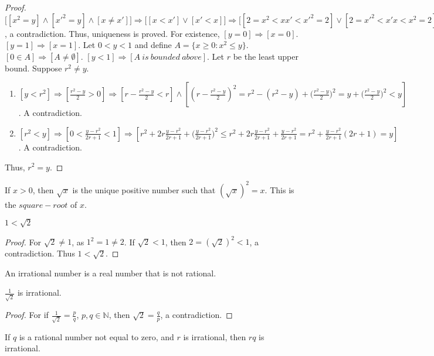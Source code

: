 \documentclass[crop=false,class=article,oneside]{standalone}
\begin{document}
    \begin{proof}
    $\big[[x^2=y]\land [x'^2=y]\land [x\ne x']\big] \Rightarrow \big[[x<x']\lor[x'<x]\big] \Rightarrow \big[[2=x^2<xx'<x'^2=2]\lor[2=x'^2<x'x<x^2=2]\big]$, a contradiction. Thus, uniqueness is proved. For existence, $[y=0]\Rightarrow[x=0]$.$[y=1]\Rightarrow [x=1]$. Let $0 < y < 1$ and define $A = \{x\geq0:x^2 \leq y\}$. $[0\in A]\Rightarrow[A\ne \emptyset]$. $[y<1]\Rightarrow [A\ is\ bounded\ above]$. Let $r$ be the least upper bound. Suppose $r^2\ne y$.
    \begin{enumerate}
    \item $[y<r^2]\Rightarrow[\frac{r^2-y}{2}>0]\Rightarrow [r-\frac{r^2-y}{2}<r]\land[(r-\frac{r^2-y}{2})^2= r^2 - (r^2-y)+\big(\frac{r^2-y}{2}\big)^2 = y + \big(\frac{r^2-y}{2}\big)^2 < y]$. A contradiction.
    \item $[r^2 <y]\Rightarrow [0<\frac{y-r^2}{2r+1}<1]\Rightarrow [r^2 + 2r\frac{y-r^2}{2r+1}+\big(\frac{y-r^2}{2r+1}\big)^2\leq r^2 + 2r\frac{y-r^2}{2r+1}+\frac{y-r^2}{2r+1} = r^2+\frac{y-r^2}{2r+1}(2r+1)=y]$. A contradiction.
    \end{enumerate}
    Thus, $r^2 = y$.
    \end{proof}
    \begin{definition}
    If $x>0$, then $\sqrt{x}$ is the unique positive number such that $(\sqrt{x})^2 = x$. This is the $square-root$ of $x$.
    \end{definition}
    \begin{corollary}
    $1<\sqrt{2}$
    \end{corollary}
    \begin{proof}
    For $\sqrt{2} \ne 1$, as $1^2 = 1\ne 2$. If $\sqrt{2}<1$, then $2=(\sqrt{2})^2 <1$, a contradiction. Thus $1<\sqrt{2}$.
    \end{proof}
    \begin{definition}
    An irrational number is a real number that is not rational.
    \end{definition}
    \begin{corollary}
    $\frac{1}{\sqrt{2}}$ is irrational. 
    \end{corollary}
    \begin{proof}
    For if $\frac{1}{\sqrt{2}} = \frac{p}{q}$, $p,q\in \mathbb{N}$, then $\sqrt{2} = \frac{q}{p}$, a contradiction.
    \end{proof}
    \begin{lemma}
    If $q$ is a rational number not equal to zero, and $r$ is irrational, then $rq$ is irrational.
    \end{lemma}
\end{document}
